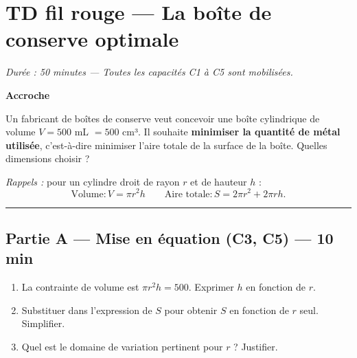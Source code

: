 

\section*{TD fil rouge — La boîte de conserve optimale}

\textit{Durée : 50 minutes — Toutes les capacités C1 à C5 sont mobilisées.}

\bigskip

\begin{center}
\textbf{Accroche}

\medskip
\parbox{0.9\textwidth}{Un fabricant de boîtes de conserve veut concevoir une boîte cylindrique de volume $V = 500$ mL $= 500$ cm³. Il souhaite \textbf{minimiser la quantité de métal utilisée}, c'est-à-dire minimiser l'aire totale de la surface de la boîte. Quelles dimensions choisir ?}
\end{center}

\bigskip

\textit{Rappels :} pour un cylindre droit de rayon $r$ et de hauteur $h$ :
\[
  \text{Volume} : V = \pi r^2 h \qquad \text{Aire totale} : S = 2\pi r^2 + 2\pi r h.
\]

\bigskip

\hrule

\bigskip

\subsection*{Partie A — Mise en équation (C3, C5) — 10 min}

\begin{enumerate}
  \item La contrainte de volume est $\pi r^2 h = 500$. Exprimer $h$ en fonction de $r$.
  \item Substituer dans l'expression de $S$ pour obtenir $S$ en fonction de $r$ seul. Simplifier.
  \item Quel est le domaine de variation pertinent pour $r$ ? Justifier.
\end{enumerate}

